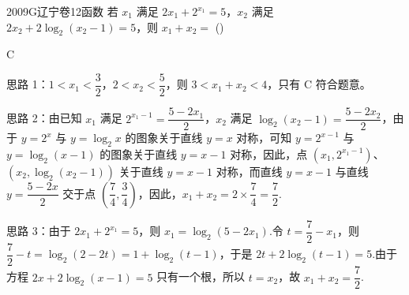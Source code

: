
\begin{problem}{2009}{G}{辽宁卷}{12}{函数}
若 $ x_1 $ 满足 $ 2x_1 + 2^{x_1} = 5 $，$ x_2 $ 满足 $ 2x_2 + 2\log_2(x_2 - 1) = 5 $，则 $ x_1 + x_2 = $ (\hspace{1cm})
\begin{choices}
\end{choices}
\end{problem}

\begin{answer}
C
\end{answer}

\begin{solutions}
思路 1：$ 1 < x_1 < \dfrac{3}{2} $，$ 2 < x_2 < \dfrac{5}{2} $，则 $ 3 < x_1 + x_2 < 4 $，只有 C 符合题意。

思路 2：由已知 $ x_1 $ 满足 $ 2^{x_1 - 1} = \dfrac{5 - 2x_1}{2} $，$ x_2 $ 满足 $ \log_2(x_2 - 1) = \dfrac{5 - 2x_2}{2} $，由于 $ y = 2^x $ 与 $ y = \log_2 x $ 的图象关于直线 $ y = x $ 对称，可知 $ y = 2^{x - 1} $ 与 $ y = \log_2(x - 1) $ 的图象关于直线 $ y = x - 1 $ 对称，因此，点 $ (x_1, 2^{x_1 - 1}) $、$ (x_2, \log_2(x_2 - 1)) $ 关于直线 $ y = x - 1 $ 对称，而直线 $ y = x - 1 $ 与直线 $ y = \dfrac{5 - 2x}{2} $ 交于点 $ \left( \dfrac{7}{4}, \dfrac{3}{4} \right) $，因此，$ x_1 + x_2 = 2 \times \dfrac{7}{4} = \dfrac{7}{2} $.

思路 3：由于 $ 2x_1 + 2^{x_1} = 5 $，则 $ x_1 = \log_2(5 - 2x_1) $.令 $ t = \dfrac{7}{2} - x_1 $，则 $ \dfrac{7}{2} - t = \log_2(2 - 2t) = 1 + \log_2(t - 1) $，于是 $ 2t + 2\log_2(t - 1) = 5 $.由于方程 $ 2x + 2\log_2(x - 1) = 5 $ 只有一个根，所以 $ t = x_2 $，故 $ x_1 + x_2 = \dfrac{7}{2} $.
\end{solutions}